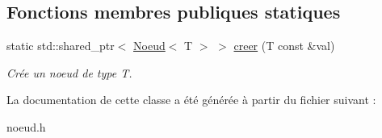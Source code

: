 \subsection*{Fonctions membres publiques statiques}
\begin{DoxyCompactItemize}
\item 
static std\+::shared\+\_\+ptr$<$ \hyperlink{classNoeud}{Noeud}$<$ T $>$ $>$ \hyperlink{classNoeud_a53503e6bae571316d778c39214693710}{creer} (T const \&val)\hypertarget{classNoeud_a53503e6bae571316d778c39214693710}{}\label{classNoeud_a53503e6bae571316d778c39214693710}

\begin{DoxyCompactList}\small\item\em Crée un noeud de type T. \end{DoxyCompactList}\end{DoxyCompactItemize}


La documentation de cette classe a été générée à partir du fichier suivant \+:\begin{DoxyCompactItemize}
\item 
noeud.\+h\end{DoxyCompactItemize}
